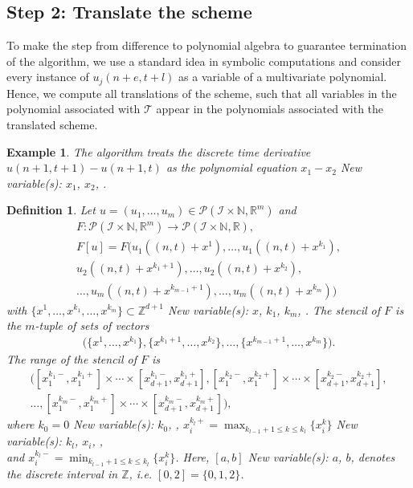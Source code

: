 \documentclass[sigconf,twocolumn]{acmart}
\newcommand{\1}{{\chi}}
\numberwithin{equation}{section}
\theoremstyle{thmlemcorr}
\numberwithin{theorem}{section}
\theoremstyle{thmlemcorr*}
\theoremstyle{defi}
\newtheorem{definition}[theorem]{Definition}
\theoremstyle{remexample}
\newtheorem{example}[theorem]{Example}
\theoremstyle{ass}
\begin{document}
\subsection*{Step 2: Translate the scheme}
To make the step from difference to polynomial algebra to guarantee termination of the algorithm, we use a standard idea in symbolic computations and consider every instance of \(u_j(n+e,t+l)\) as a variable of a multivariate polynomial.
Hence, we compute all translations of the scheme, such that all variables in the polynomial associated with \(\mathcal{T}\) appear in the polynomials associated with the translated scheme.
\begin{example}
	The algorithm treats the discrete time derivative \(u(n+1,t+1)-u(n+1,t)\)
	as the polynomial equation \(x_1-x_2\)
{\color{blue} New variable(s): \(x_1\), \(x_2\),  }
.
\end{example}
	\begin{definition}
		Let \(u=(u_1,\ldots,u_m)\in\mathcal{P}({\mathcal{I}}\times{\mathbb{N}},{\mathbb{R}}^m)\) and
		\begin{gather*}
			F:
				\mathcal{P}({\mathcal{I}}\times{\mathbb{N}},{\mathbb{R}}^m)\rightarrow\mathcal{P}({\mathcal{I}}\times{\mathbb{N}},{\mathbb{R}}),\\
				F[u]=F(u_1((n,t)+x^1),\ldots,u_1((n,t)+x^{k_1}),\\
				u_2((n,t)+x^{k_1+1}),
				\ldots,u_2((n,t)+x^{k_2}),\\
				\ldots,
				u_m((n,t)+x^{k_{m-1}+1}),\ldots,u_m((n,t)+x^{k_m}))
		\end{gather*}
	\normalsize
	with \(\{x^1,\ldots,x^{k_1},\ldots,x^{k_m}\}\subset{\mathbb{Z}}^{d+1}\)
{\color{blue} New variable(s): \(x\), \(k_1\), \(k_m\),  }
.
	The \emph{stencil} of \(F\) is the \(m\)-tuple of sets of vectors
	\begin{gather*}
		\Big(\big\{x^1,\ldots,x^{k_1}\big\},
		\big\{x^{k_1+1},\ldots,x^{k_2}\big\},
		\ldots,
		\big\{x^{k_{m-1}+1},\ldots,x^{k_m}\big\}\Big).
	\end{gather*}
	The \emph{range} of the stencil of \(F\) is
		\begin{gather*}
		\Big([x_1^{k_1 -},x_1^{k_1 +}]\times\cdots\times[x_{d+1}^{k_1 -},x_{d+1}^{k_1 +}],
		[x_1^{k_2 -},x_1^{k_2 +}]\times\cdots\times[x_{d+1}^{k_2 -},x_{d+1}^{k_2 +}],
		\\	\dots,
		[x_1^{k_m -},x_1^{k_m +}]\times\cdots\times[x_{d+1}^{k_m -},x_{d+1}^{k_m +}]
		\Big),
	\end{gather*}
	where \(k_0=0\)
{\color{blue} New variable(s): \(k_0\),  }
, \(x^{k_l +}_i = \max_{k_{l-1}+1\leq k\leq k_l}\{x_i^k\}\)
{\color{blue} New variable(s): \(k_l\), \(x_i\),  }
,\\
	and \(x^{k_l -}_i = \min_{k_{l-1}+1\leq k\leq k_l}\{x_i^k\}\). Here, \([a,b]\)
{\color{blue} New variable(s): \(a\), \(b\),  }
 denotes the discrete interval in \({\mathbb{Z}}\), i.e. \([0,2]=\{0,1,2\}\).
	\end{definition}
\end{document}
